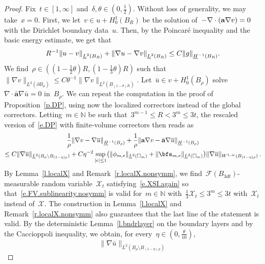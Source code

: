 \documentclass[11pt,twoside]{article} %
\let\oldsquare\square %
\renewcommand{\square}{\oldsquare}
\numberwithin{equation}{section}
\theoremstyle{definition}
\let\originalleft\left
\let\originalright\right
\renewcommand{\left}{\mathopen{}\mathclose\bgroup\originalleft}
\renewcommand{\right}{\aftergroup\egroup\originalright}
\newcommand*{\N}{\ensuremath{\mathbb{N}}}
\renewcommand{\a}{\mathbf{a}}
\newcommand{\ahom}{\bar{\a}}
\newcommand{\cu}{\square}
\newcommand{\F}{\mathcal{F}}
\newcommand{\X}{\mathcal{X}}
\begin{document}
\begin{proof}
Fix~$t \in [1,\infty]$ and~$\delta,\theta \in (0,\frac12)$.
Without loss of generality, we may take~$x=0$. 
First, we let~$v \in u + H_0^1(B_R)$ be the solution of~$-\nabla \cdot \left( \a\nabla v \right) = 0$ with the Dirichlet boundary data~$u$. Then, by the Poincar\'e inequality and the basic energy estimate, we get that
\begin{align}  \label{e.v.basicenergyest}
R^{-1} \left\| u - v \right\|_{\underline{L}^{2} \left( B_{R} \right)} 
+
  \left\| \nabla u - \nabla v \right\|_{\underline{L}^{2} \left( B_{R} \right)}
\leq 
C  \left\| g \right\|_{\underline{H}^{-1}(B_R)}
.
\end{align}
We find~$\rho \in ((1-\frac12\theta)R,(1-\frac13\theta)R)$  such that~$\| \nabla v \|_{\underline{L}^2(\partial B_{\rho})} \leq C \theta^{-1} \| \nabla v \|_{\underline{L}^2(B_{(1-\theta)R})}$. Let~$\bar u \in v + H_0^1(B_\rho)$ solve~$\nabla \cdot \ahom \nabla \bar u = 0$ in~$B_\rho$. We can repeat the computation in the proof of Proposition~\ref{p.DP}, using now the localized correctors instead of the global correctors. Letting~$m \in \N$ be such that~$3^{m-1} \leq R < 3^m \leq 3t$, the rescaled version of~\eqref{e.DP} with finite-volume correctors then reads as 
\begin{multline*} 
\frac1\rho\left\| \nabla v - \nabla \overline{u}  \right\|_{\underline{H}^{-1}(B_{\rho})} 
+
\frac1\rho \left\| \a \nabla v - \ahom \nabla \overline{u}  \right\|_{\underline{H}^{-1}(B_{\rho})} 
\\ 
\leq 
C \| \nabla \overline{u} \|_{\underline{L}^2(B_{\rho} \setminus B_{(1-\eta)\rho} ) } 
+ C \eta^{-2} \sup_{|e| \leq 1}\bigl( \| \phi_{m,e} \|_{\underline{L}^2(\cu_m)} 
+
\| \bfs_{m,e} \|_{\underline{L}^2(\cu_m)}  \bigr) 
 \| \nabla \overline{u} \|_{W^{1,\infty}(B_{(1-\eta)\rho} ) }
\,.
\end{multline*}
By Lemma~\ref{l.localX} and Remark~\ref{r.localX.nonsymm}, we find~$\F(B_{3d t})$-measurable random variable~$\X_t$ satisfying~\eqref{e.XSI.again} so that~\eqref{e.FV.sublinearity.nosymm} is valid for~$m\in \N$ with~$\frac13 \X_t \leq 3^m \leq 3 t$ with~$\X_t$ instead of~$\X$. The construction in Lemma~\ref{l.localX} and Remark~\ref{r.localX.nonsymm} also guarantees that the last line of the statement is valid. By the deterministic Lemma~\ref{l.bndrlayer} on the boundary layers and by the Caccioppoli inequality, we obtain, for every~$\eta \in (0,\frac \theta{10})$, 
\begin{equation*}
\| \nabla \bar u \|_{L^2(B_{\rho} \setminus B_{(1-\eta) \rho})} 

\end{equation*}
\end{proof}
\end{document}
